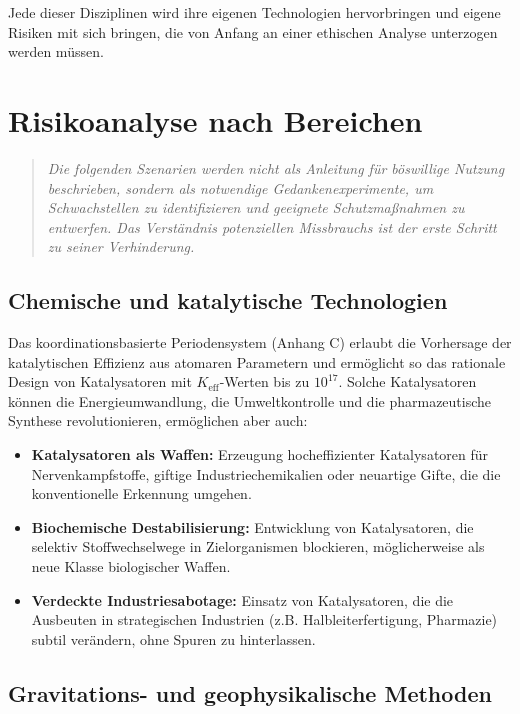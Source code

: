 \documentclass[12pt,a4paper]{article}
\theoremstyle{remark}
\newcommand{\Keff}{K_{\mathrm{eff}}}
\begin{document}
	Jede dieser Disziplinen wird ihre eigenen Technologien hervorbringen und eigene Risiken mit sich bringen, die von Anfang an einer ethischen Analyse unterzogen werden müssen.
	
	\section{Risikoanalyse nach Bereichen}
	\label{sec:risks}
	
	\begin{quote}
		\emph{Die folgenden Szenarien werden nicht als Anleitung für böswillige Nutzung beschrieben, sondern als notwendige Gedankenexperimente, um Schwachstellen zu identifizieren und geeignete Schutzmaßnahmen zu entwerfen. Das Verständnis potenziellen Missbrauchs ist der erste Schritt zu seiner Verhinderung.}
	\end{quote}
	
	\subsection{Chemische und katalytische Technologien}
	\label{subsec:chem}
	
	Das koordinationsbasierte Periodensystem (Anhang C) erlaubt die Vorhersage der katalytischen Effizienz aus atomaren Parametern und ermöglicht so das rationale Design von Katalysatoren mit \(\Keff\)-Werten bis zu \(10^{17}\). Solche Katalysatoren können die Energieumwandlung, die Umweltkontrolle und die pharmazeutische Synthese revolutionieren, ermöglichen aber auch:
	\begin{itemize}[leftmargin=*]
		\item \textbf{Katalysatoren als Waffen:} Erzeugung hocheffizienter Katalysatoren für Nervenkampfstoffe, giftige Industriechemikalien oder neuartige Gifte, die die konventionelle Erkennung umgehen.
		\item \textbf{Biochemische Destabilisierung:} Entwicklung von Katalysatoren, die selektiv Stoffwechselwege in Zielorganismen blockieren, möglicherweise als neue Klasse biologischer Waffen.
		\item \textbf{Verdeckte Industriesabotage:} Einsatz von Katalysatoren, die die Ausbeuten in strategischen Industrien (z.B. Halbleiterfertigung, Pharmazie) subtil verändern, ohne Spuren zu hinterlassen.
	\end{itemize}
	
	\subsection{Gravitations- und geophysikalische Methoden}
	\label{subsec:gravity}
	
\end{document}
